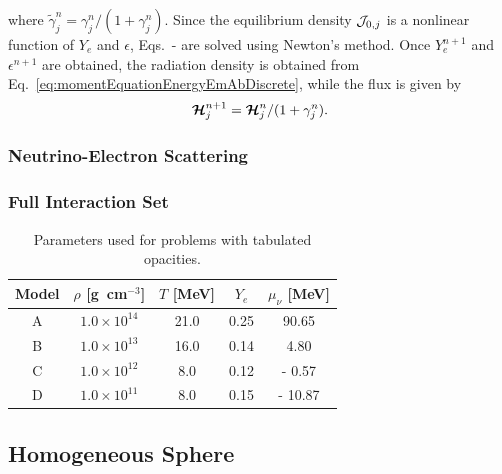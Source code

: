 \documentclass[10pt,preprint]{aastex}
\begin{document}
where $\tilde{\gamma}_{j}^{n}=\gamma_{j}^{n}/(1+\gamma_{j}^{n})$.  
Since the equilibrium density $\mathcal{J}_{0,j}$ is a nonlinear function of $Y_{e}$ and $\epsilon$, Eqs.~\label{eq:electronFractionEmAbDiscrete}-\label{eq:internalEnergyEmAbDiscrete} are solved using Newton's method.  
Once $Y_{e}^{n+1}$ and $\epsilon^{n+1}$ are obtained, the radiation density is obtained from Eq.~\eqref{eq:momentEquationEnergyEmAbDiscrete}, while the flux is given by
\begin{equation}
  \boldsymbol{\mathcal{H}}_{j}^{n+1}=\boldsymbol{\mathcal{H}}_{j}^{n}/(1+\gamma_{j}^{n}).  
  \label{eq:momentEquationMomentumEmAbDiscrete}
\end{equation}

\subsubsection{Neutrino-Electron Scattering}

\subsubsection{Full Interaction Set}

\begin{table}
  \caption{Parameters used for problems with tabulated opacities. \label{tab:tabulatedModels}}
  \begin{tabular}{ccccc}
    Model & $\rho$ [g~cm$^{-3}$] & $T$ [MeV] & $Y_{e}$ & $\mu_{\nu}$ [MeV] \\
    \midrule \midrule
    A & $1.0\times10^{14}$ & 21.0  & 0.25 &   90.65 \\
    B & $1.0\times10^{13}$ & 16.0 & 0.14 &     4.80 \\
    C & $1.0\times10^{12}$ &   8.0 & 0.12 & -   0.57 \\
    D & $1.0\times10^{11}$ &   8.0 & 0.15 & - 10.87 \\
    \midrule \midrule
  \end{tabular}
\end{table}

\subsection{Homogeneous Sphere}
\end{document}

